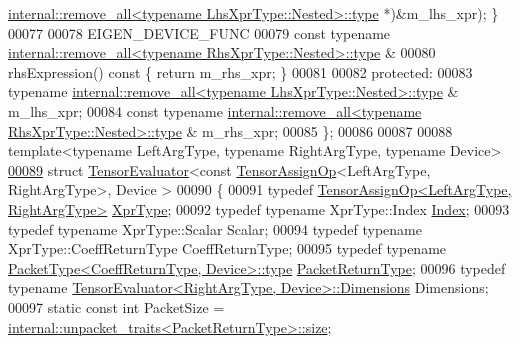 \begin{DoxyCode}
      \hyperlink{group___sparse_core___module}{internal::remove\_all<typename LhsXprType::Nested>::type}
      *)&m\_lhs\_xpr); \}
00077 
00078     EIGEN\_DEVICE\_FUNC
00079     \textcolor{keyword}{const} \textcolor{keyword}{typename} \hyperlink{group___sparse_core___module}{internal::remove\_all<typename RhsXprType::Nested>::type}
      &
00080     rhsExpression()\textcolor{keyword}{ const }\{ \textcolor{keywordflow}{return} m\_rhs\_xpr; \}
00081 
00082   \textcolor{keyword}{protected}:
00083     \textcolor{keyword}{typename} \hyperlink{group___sparse_core___module}{internal::remove\_all<typename LhsXprType::Nested>::type}
      & m\_lhs\_xpr;
00084     \textcolor{keyword}{const} \textcolor{keyword}{typename} \hyperlink{group___sparse_core___module}{internal::remove\_all<typename RhsXprType::Nested>::type}
      & m\_rhs\_xpr;
00085 \};
00086 
00087 
00088 \textcolor{keyword}{template}<\textcolor{keyword}{typename} LeftArgType, \textcolor{keyword}{typename} RightArgType, \textcolor{keyword}{typename} Device>
\hyperlink{struct_eigen_1_1_tensor_evaluator_3_01const_01_tensor_assign_op_3_01_left_arg_type_00_01_right_arg_type_01_4_00_01_device_01_4}{00089} \textcolor{keyword}{struct }\hyperlink{struct_eigen_1_1_tensor_evaluator}{TensorEvaluator}<const \hyperlink{class_eigen_1_1_tensor_assign_op}{TensorAssignOp}<LeftArgType, RightArgType>, Device
      >
00090 \{
00091   \textcolor{keyword}{typedef} \hyperlink{class_eigen_1_1_tensor_assign_op}{TensorAssignOp<LeftArgType, RightArgType>} 
      \hyperlink{class_eigen_1_1_tensor_assign_op}{XprType};
00092   \textcolor{keyword}{typedef} \textcolor{keyword}{typename} XprType::Index \hyperlink{namespace_eigen_a62e77e0933482dafde8fe197d9a2cfde}{Index};
00093   \textcolor{keyword}{typedef} \textcolor{keyword}{typename} XprType::Scalar Scalar;
00094   \textcolor{keyword}{typedef} \textcolor{keyword}{typename} XprType::CoeffReturnType CoeffReturnType;
00095   \textcolor{keyword}{typedef} \textcolor{keyword}{typename} \hyperlink{group___sparse_core___module}{PacketType<CoeffReturnType, Device>::type} 
      \hyperlink{group___sparse_core___module}{PacketReturnType};
00096   \textcolor{keyword}{typedef} \textcolor{keyword}{typename} \hyperlink{struct_eigen_1_1_tensor_evaluator}{TensorEvaluator<RightArgType, Device>::Dimensions}
       Dimensions;
00097   \textcolor{keyword}{static} \textcolor{keyword}{const} \textcolor{keywordtype}{int} PacketSize = 
      \hyperlink{struct_eigen_1_1internal_1_1unpacket__traits}{internal::unpacket\_traits<PacketReturnType>::size};

\end{DoxyCode}
